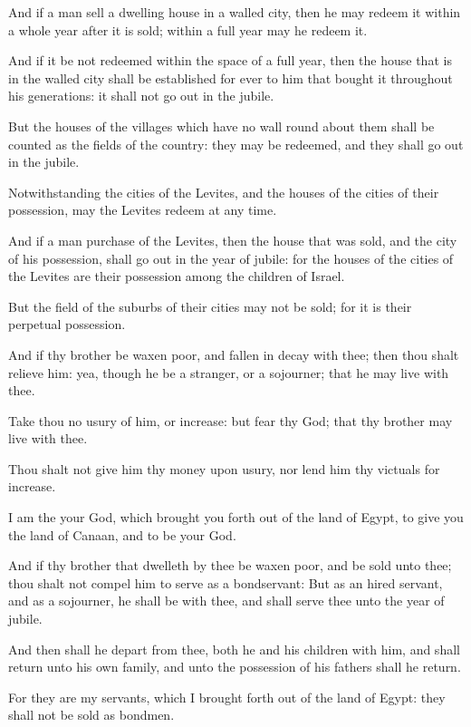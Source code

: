 \Verse And if a man sell a dwelling house in a walled city, then he may redeem it within a whole year after it is sold; within a full year may he redeem it.

\Verse And if it be not redeemed within the space of a full year, then the house that is in the walled city shall be established for ever to him that bought it throughout his generations: it shall not go out in the jubile.

\Verse But the houses of the villages which have no wall round about them shall be counted as the fields of the country: they may be redeemed, and they shall go out in the jubile.

\Verse Notwithstanding the cities of the Levites, and the houses of the cities of their possession, may the Levites redeem at any time.

\Verse And if a man purchase of the Levites, then the house that was sold, and the city of his possession, shall go out in the year of jubile: for the houses of the cities of the Levites are their possession among the children of Israel.

\Verse But the field of the suburbs of their cities may not be sold; for it is their perpetual possession.

\Verse And if thy brother be waxen poor, and fallen in decay with thee; then thou shalt relieve him: yea, though he be a stranger, or a sojourner; that he may live with thee.

\Verse Take thou no usury of him, or increase: but fear thy God; that thy brother may live with thee.

\Verse Thou shalt not give him thy money upon usury, nor lend him thy victuals for increase.

\Verse I am the \LORD your God, which brought you forth out of the land of Egypt, to give you the land of Canaan, and to be your God.

\Verse And if thy brother that dwelleth by thee be waxen poor, and be sold unto thee; thou shalt not compel him to serve as a bondservant: \Verse But as an hired servant, and as a sojourner, he shall be with thee, and shall serve thee unto the year of jubile.

\Verse And then shall he depart from thee, both he and his children with him, and shall return unto his own family, and unto the possession of his fathers shall he return.

\Verse For they are my servants, which I brought forth out of the land of Egypt: they shall not be sold as bondmen.

